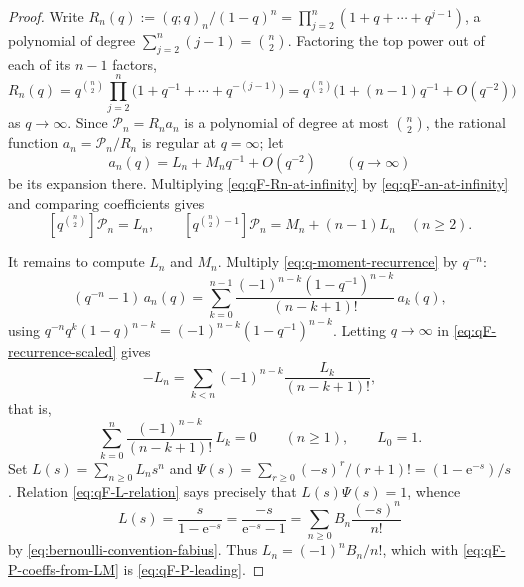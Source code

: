 \documentclass[11pt,oneside,openany]{book}
\theoremstyle{definition}
\theoremstyle{remark}
\newcommand{\poch}[3]{(#1;#2)_{#3}}
\newcommand{\e}{\mathrm e}
\newcommand{\defeq}{\mathrel{:=}}
\begin{document}
\begin{proof}
Write $R_n(q)\defeq\poch qqn/(1-q)^n=\prod_{j=2}^{n}(1+q+\cdots+q^{j-1})$, a
polynomial of degree $\sum_{j=2}^n(j-1)=\binom n2$.  Factoring the top power out
of each of its $n-1$ factors,
\begin{equation}\label{eq:qF-Rn-at-infinity}
 R_n(q)=q^{\binom n2}\prod_{j=2}^{n}\bigl(1+q^{-1}+\cdots+q^{-(j-1)}\bigr)
       =q^{\binom n2}\bigl(1+(n-1)q^{-1}+O(q^{-2})\bigr)
\end{equation}
as $q\to\infty$.  Since $\mathcal P_n=R_na_n$ is a polynomial of degree at most
$\binom n2$, the rational function $a_n=\mathcal P_n/R_n$ is regular at
$q=\infty$; let
\begin{equation}\label{eq:qF-an-at-infinity}
 a_n(q)=L_n+M_nq^{-1}+O(q^{-2})
 \qquad(q\to\infty)
\end{equation}
be its expansion there.  Multiplying \eqref{eq:qF-Rn-at-infinity} by
\eqref{eq:qF-an-at-infinity} and comparing coefficients gives
\begin{equation}\label{eq:qF-P-coeffs-from-LM}
 [q^{\binom n2}]\mathcal P_n=L_n,
 \qquad
 [q^{\binom n2-1}]\mathcal P_n=M_n+(n-1)L_n\quad(n\ge2).
\end{equation}

It remains to compute $L_n$ and $M_n$.  Multiply
\eqref{eq:q-moment-recurrence} by $q^{-n}$:
\begin{equation}\label{eq:qF-recurrence-scaled}
 (q^{-n}-1)\,a_n(q)
 =\sum_{k=0}^{n-1}\frac{(-1)^{n-k}(1-q^{-1})^{n-k}}{(n-k+1)!}\,a_k(q),
\end{equation}
using $q^{-n}q^k(1-q)^{n-k}=(-1)^{n-k}(1-q^{-1})^{n-k}$.  Letting
$q\to\infty$ in \eqref{eq:qF-recurrence-scaled} gives
\[
 -L_n=\sum_{k<n}(-1)^{n-k}\frac{L_k}{(n-k+1)!},
\]
that is,
\begin{equation}\label{eq:qF-L-relation}
 \sum_{k=0}^{n}\frac{(-1)^{n-k}}{(n-k+1)!}\,L_k=0
 \qquad(n\ge1),
 \qquad L_0=1 .
\end{equation}
Set $L(s)=\sum_{n\ge0}L_ns^n$ and
$\Psi(s)=\sum_{r\ge0}(-s)^r/(r+1)!=(1-\e^{-s})/s$.  Relation
\eqref{eq:qF-L-relation} says precisely that $L(s)\Psi(s)=1$, whence
\[
 L(s)=\frac{s}{1-\e^{-s}}=\frac{-s}{\e^{-s}-1}
      =\sum_{n\ge0}B_n\frac{(-s)^n}{n!}
\]
by \eqref{eq:bernoulli-convention-fabius}.  Thus $L_n=(-1)^nB_n/n!$, which with
\eqref{eq:qF-P-coeffs-from-LM} is \eqref{eq:qF-P-leading}.


\end{proof}
\end{document}
